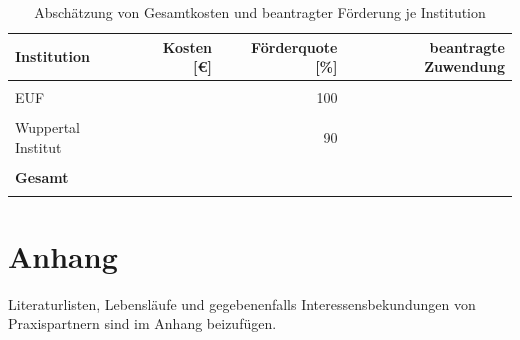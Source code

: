 \documentclass[a4paper,11pt,twoside]{scrartcl}
\begin{document}
\begin{table}[h]
\begin{center}
  \caption{Abschätzung von Gesamtkosten und beantragter Förderung je Institution}
\begin{tabular}[h]{l | rr | r}
Institution & Kosten [\euro] & Förderquote [\%] & beantragte Zuwendung \\
\hline
\hline
 &&&\\
 EUF & & 100 &\\
 \hline
 &&&\\
 Wuppertal Institut & & 90 &\\
 \hline
 &&&\\
 \textbf{Gesamt} & &  &\underline{\textbf{}}\\
 \label{tab:kostenkalkulation2}
\end{tabular}
\end{center}
\end{table}

\clerearpage


%


\clearpage
\appendix

\section{Anhang}

Literaturlisten, Lebensläufe und gegebenenfalls Interessensbekundungen von Praxispartnern sind im Anhang beizufügen.
\end{document}

